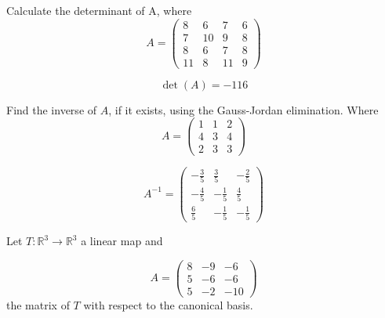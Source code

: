 \begin{questions}

\question Calculate the determinant of A, where
$$
A=\left(\begin{array}{rrrr}
8 & 6 & 7 & 6 \\
7 & 10 & 9 & 8 \\
8 & 6 & 7 & 8 \\
11 & 8 & 11 & 9
\end{array}\right)
$$

\begin{solution}
$$\det(A)=-116$$
\end{solution}

\question Find the inverse of $A$, if it exists, using the Gauss-Jordan elimination. Where
$$
A=\left(\begin{array}{rrr}
1 & 1 & 2 \\
4 & 3 & 4 \\
2 & 3 & 3
\end{array}\right)
$$

\begin{solution}
$$A^{-1}=\left(\begin{array}{rrr}
-\frac{3}{5} & \frac{3}{5} & -\frac{2}{5} \\
-\frac{4}{5} & -\frac{1}{5} & \frac{4}{5} \\
\frac{6}{5} & -\frac{1}{5} & -\frac{1}{5}
\end{array}\right)$$
\end{solution}

\question Let $T:\mathbb{R}^3\rightarrow\mathbb{R}^3$  a linear map and
 
$$
A=\left(\begin{array}{rrr}
8 & -9 & -6 \\
5 & -6 & -6 \\
5 & -2 & -10
\end{array}\right)
$$
the matrix of $T$ with respect to the canonical basis.
\end{questions}
